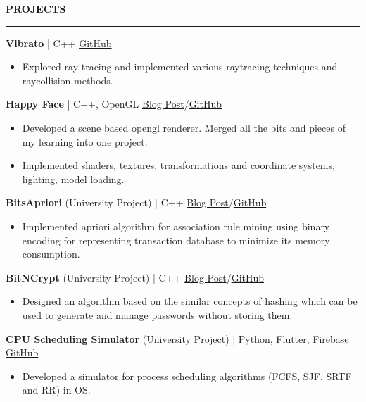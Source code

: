 \documentclass[a4paper, 11pt]{article}
\newenvironment{resumeSection}[1]
{
    \MakeUppercase{\Large\textbf{#1}}
    \medskip
    \hrule
    \begin{list}{}
    {
        \setlength\itemsep{-0.3em}
        \setlength\leftmargin{0em}
    }
    \vspace{-1em}
    \item[]
}
{   \end{list}  }
\newenvironment{sectionItems}
{
    \vspace{-0.5em}
    \begin{itemize}
    \setlength{\itemsep}{-0.7em}
}
{
    \end{itemize}
}
\begin{document}
\medskip
\begin{resumeSection}{Projects}
    \item \textbf{Vibrato} | {C++}
    \hfill \href{https://github.com/JayNakum/Vibrato}{GitHub}
    \begin{sectionItems}
        \setlength\itemsep{-0.5em}
        \item Explored ray tracing and implemented various raytracing techniques and raycollision methods.
    \end{sectionItems}

    \item \textbf{Happy Face} | {C++, OpenGL}
    \hfill 
    \href{https://jaynakum.github.io/blog/1/HappyFace}{Blog Post}/\href{https://github.com/JayNakum/HappyFace}{GitHub}
    \begin{sectionItems}
        \setlength\itemsep{-0.5em}
        \item Developed a scene based opengl renderer. Merged all the bits and pieces of my learning into one project.
        \item Implemented shaders, textures, transformations and coordinate systems, lighting, model loading.
    \end{sectionItems}

    \item \textbf{BitsApriori} (University Project) | {C++}
    \hfill 
    \href{https://jaynakum.github.io/blog/2/BitsApriori}{Blog Post}/\href{https://github.com/JayNakum/BitsApriori}{GitHub}
    \begin{sectionItems}
        \setlength\itemsep{-0.5em}
        \item Implemented apriori algorithm for association rule mining using binary encoding for representing transaction database to minimize its memory consumption.
    \end{sectionItems}

    \item \textbf{BitNCrypt} (University Project) | {C++}
    \hfill
    \href{https://jaynakum.github.io/blog/3/BitNCrypt}{Blog Post}/\href{https://github.com/JayNakum/BitNCrypt}{GitHub}
    \begin{sectionItems}
        \setlength\itemsep{-0.5em}
        \item Designed an algorithm based on the similar concepts of hashing which can be used to generate and manage passwords without storing them.
    \end{sectionItems}

    \item \textbf{CPU Scheduling Simulator} (University Project) | {Python, Flutter, Firebase}
    \hfill \href{https://github.com/JayNakum/OperatingSystemsProject}{GitHub}
    \begin{sectionItems}
        \item Developed a simulator for process scheduling algorithms (FCFS, SJF, SRTF and RR) in OS.
    \end{sectionItems}


\end{resumeSection}
\end{document}
